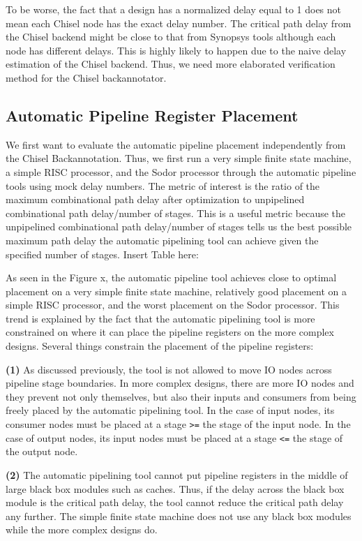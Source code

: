 To be worse, the fact that a design has a normalized delay equal to 1 does not mean each Chisel node has the exact delay number. The critical path delay from the Chisel backend might be close to that from Synopsys tools although each node has different delays. This is highly likely to happen due to the naive delay estimation of the Chisel backend. Thus, we need more elaborated verification method for the Chisel backannotator.

\subsection{Automatic Pipeline Register Placement}
We first want to evaluate the automatic pipeline placement independently from the Chisel Backannotation. Thus, we first run a very simple finite state machine, a simple RISC processor, and the Sodor processor through the automatic pipeline tools using mock delay numbers.  The metric of interest is the ratio of the maximum combinational path delay after optimization to unpipelined combinational path delay/number of stages. This is a useful metric because the unpipelined combinational path delay/number of stages tells us the best possible maximum path delay the automatic pipelining tool can achieve given the specified number of stages. Insert Table here:

As seen in the Figure x, the automatic pipeline tool achieves close to optimal placement on a very simple finite state machine, relatively good placement on a simple RISC processor, and the worst placement on the Sodor processor. This trend is explained by the fact that the automatic pipelining tool is more constrained on where it can place the pipeline registers on the more complex designs. Several things constrain the placement of the pipeline registers:

{\bf (1)} 
As discussed previously, the tool is not allowed to move IO nodes across pipeline stage boundaries. In more complex designs, there are more IO nodes and they prevent not only themselves, but also their inputs and consumers from being freely placed by the automatic pipelining tool. In the case of input nodes, its consumer nodes must be placed at a stage {\tt >=} the stage of the input node. In the case of output nodes, its input nodes must be placed at a stage {\tt <=} the stage of the output node.

{\bf (2)}  
The automatic pipelining tool cannot put pipeline registers in the middle of large black box modules such as caches. Thus, if the delay across the black box module is the critical path delay, the tool cannot reduce the critical path delay any further. The simple finite state machine does not use any black box modules while the more complex designs do.

